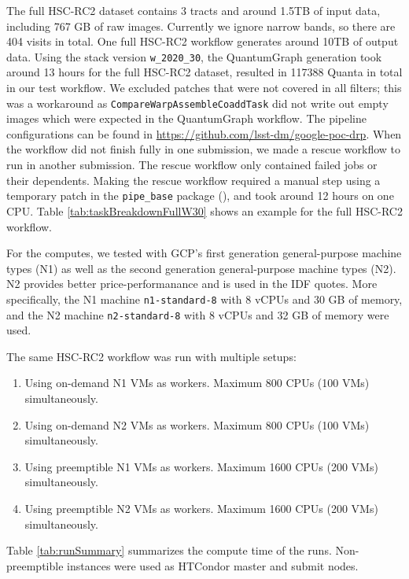 The full HSC-RC2 dataset contains 3 tracts and around 1.5TB of input data, including 767 GB of raw images.
Currently we ignore narrow bands, so there are 404 visits in total.
One full HSC-RC2 workflow generates around 10TB of output data.
Using the stack version \texttt{w\_2020\_30}, the QuantumGraph generation took around 13 hours for the full HSC-RC2 dataset, resulted in 117388 Quanta in total in our test workflow.
We excluded patches that were not covered in all filters; this was a workaround as \texttt{CompareWarpAssembleCoaddTask} did not write out empty images which were expected in the QuantumGraph workflow.
The pipeline configurations can be found in \url{https://github.com/lsst-dm/google-poc-drp}.
When the workflow did not finish fully in one submission, we made a rescue workflow to run in another submission.
The rescue workflow only contained failed jobs or their dependents.
Making the rescue workflow required a manual step using a temporary patch in the \texttt{pipe\_base} package (), and took around 12 hours on one CPU.
Table \ref{tab:taskBreakdownFullW30} shows an example for the full HSC-RC2 workflow.

%
%


For the computes, we tested with GCP's first generation general-purpose machine types (N1) as well as the second generation general-purpose machine types (N2).
N2 provides better price-performanance and is used in the IDF quotes.
More specifically, the N1 machine \texttt{n1-standard-8} with 8 vCPUs and 30 GB of memory, and the N2 machine \texttt{n2-standard-8} with 8 vCPUs and 32 GB of memory were used.

The same HSC-RC2 workflow was run with multiple setups:

\begin{enumerate}
\item
Using on-demand N1 VMs as workers. Maximum 800 CPUs (100 VMs) simultaneously.
\item
Using on-demand N2 VMs as workers. Maximum 800 CPUs (100 VMs) simultaneously.
\item
Using preemptible N1 VMs as workers. Maximum 1600 CPUs (200 VMs) simultaneously.
\item
Using preemptible N2 VMs as workers. Maximum 1600 CPUs (200 VMs) simultaneously.
\end{enumerate}

Table \ref{tab:runSummary} summarizes the compute time of the runs.
Non-preemptible instances were used as HTCondor master and submit nodes.



